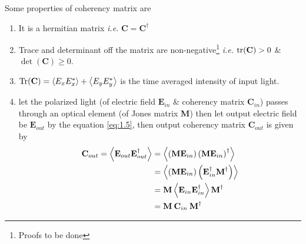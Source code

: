 \documentclass[11pt,a4paper]{article}
\numberwithin{equation}{section}
\begin{document}
Some properties of coherency matrix are
\begin{enumerate}
	\item It is a hermitian matrix \textit{i.e.} $\textbf{C}=\textbf{C}^\dagger$
	\item Trace and determinant off the matrix are non-negative\footnote{Proofs to be done} \textit{i.e.} $\tr(\textbf{C})>0$ \& $\det(\textbf{C})\ge0$.
	\item $\Tr(\textbf{C}) = \expval{E_x E_x^\ast} +\expval{E_y E_y^\ast}$ is the time averaged intensity of input light.
	\item let the polarized light (of electric field $\textbf{E}_{in}$ \& coherency matrix $\textbf{C}_{in}$) passes through an optical element (of Jones matrix \textbf{M}) then let output electric field be $\textbf{E}_{out}$ by the equation \ref{eq:1.5}, then output coherency matrix $\textbf{C}_{out}$ is given by 
	\begin{align}
		\textbf{C}_{out} = \expval{\textbf{E}_{out}\textbf{E}_{out}^\dagger} &= \expval{\left(\textbf{M}\textbf{E}_{in} \right) \left(\textbf{M}\textbf{E}_{in}\right)^\dagger}\nonumber\\
		&= \expval{\left(\textbf{M}\textbf{E}_{in} \right) \left(\textbf{E}_{in}^\dagger\textbf{M}^\dagger\right)}\nonumber \\
		&= \textbf{M}\expval{\textbf{E}_{in} \textbf{E}_{in}^\dagger}\textbf{M}^\dagger \nonumber\\
		&= \textbf{M}\:\textbf{C}_{in}\:\textbf{M}^\dagger
	\end{align}
\end{enumerate}
\end{document}
